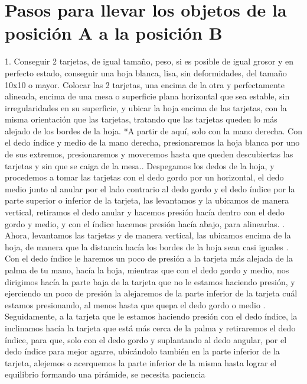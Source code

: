\documentclass{article}
\begin{document}
\section{Pasos para llevar  los objetos de la posición A a la posición B} \label{contenido}
1.	Conseguir 2 tarjetas, de igual tamaño, peso, si es posible de igual grosor y en perfecto estado, conseguir una hoja blanca, lisa, sin deformidades, del tamaño 10x10 o mayor.	Colocar las 2 tarjetas, una encima de la otra y perfectamente alineada, encima de una mesa o superficie plana horizontal que sea estable, sin irregularidades en su superficie, y ubicar la hoja encima de las tarjetas, con la misma orientación que las tarjetas, tratando que las tarjetas queden lo más alejado de los bordes de la hoja.\newline
*A partir de aquí, solo con la mano derecha.	Con el dedo índice y medio de la mano derecha, presionaremos la hoja blanca por uno de sus extremos, presionaremos y moveremos hasta que queden descubiertas las tarjetas y sin que se caiga de la mesa..	Despegamos los dedos de la hoja, y procedemos a tomar las tarjetas con el dedo gordo por un horizontal, el dedo medio junto al anular por el lado contrario al dedo gordo y el dedo índice por la parte superior o inferior de la tarjeta, las levantamos y la ubicamos de manera vertical, retiramos el dedo anular y hacemos presión hacía dentro con el dedo gordo y medio, y con el índice hacemos presión hacía abajo, para alinearlas. .	Ahora, levantamos las tarjetas y de manera vertical, las ubicamos encima de la hoja, de manera que la distancia hacía los bordes de la hoja sean casi iguales .	Con el dedo índice le haremos un poco de presión a la tarjeta más alejada de la palma de tu mano, hacía la hoja, mientras que con el dedo gordo y medio, nos dirigimos hacía la parte baja de la tarjeta que no le estamos haciendo presión, y ejerciendo un poco de presión la alejaremos de la parte inferior de la tarjeta cuál estamos presionando, al menos hasta que quepa el dedo gordo o medio .	Seguidamente, a la tarjeta que le estamos haciendo presión con el dedo índice, la inclinamos hacía la tarjeta que está más cerca de la palma y retiraremos el dedo índice, para que, solo con el dedo gordo y suplantando al dedo angular, por el dedo índice para mejor agarre, ubicándolo también en la parte inferior de la tarjeta, alejemos o acerquemos la parte inferior de la misma hasta lograr el equilibrio formando una pirámide, se necesita paciencia





\end{document}
